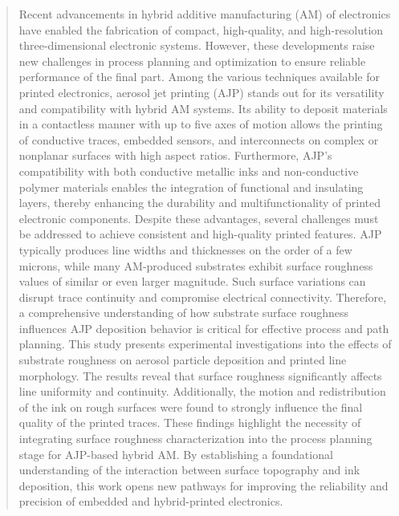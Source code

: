 \documentclass[subscriptcorrection,upint,varvw,balance,hyphenate]{asmejour}
\begin{document}
\begin{abstract}
Recent advancements in hybrid additive manufacturing (AM) of electronics have enabled the fabrication of compact, high-quality, and high-resolution three-dimensional electronic systems. However, these developments raise new challenges in process planning and optimization to ensure reliable performance of the final part. Among the various techniques available for printed electronics, aerosol jet printing (AJP) stands out for its versatility and compatibility with hybrid AM systems. Its ability to deposit materials in a contactless manner with up to five axes of motion allows the printing of conductive traces, embedded sensors, and interconnects on complex or nonplanar surfaces with high aspect ratios. Furthermore, AJP's compatibility with both conductive metallic inks and non-conductive polymer materials enables the integration of functional and insulating layers, thereby enhancing the durability and multifunctionality of printed electronic components.
Despite these advantages, several challenges must be addressed to achieve consistent and high-quality printed features. AJP typically produces line widths and thicknesses on the order of a few microns, while many AM-produced substrates exhibit surface roughness values of similar or even larger magnitude. Such surface variations can disrupt trace continuity and compromise electrical connectivity. Therefore, a comprehensive understanding of how substrate surface roughness influences AJP deposition behavior is critical for effective process and path planning.
This study presents experimental investigations into the effects of substrate roughness on aerosol particle deposition and printed line morphology. The results reveal that surface roughness significantly affects line uniformity and continuity. Additionally, the motion and redistribution of the ink on rough surfaces were found to strongly influence the final quality of the printed traces.
These findings highlight the necessity of integrating surface roughness characterization into the process planning stage for AJP-based hybrid AM. By establishing a foundational understanding of the interaction between surface topography and ink deposition, this work opens new pathways for improving the reliability and precision of embedded and hybrid-printed electronics.

\end{abstract}
\end{document}
